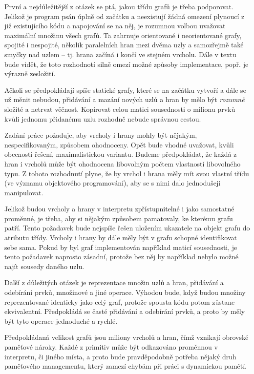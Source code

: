 \documentclass[11pt,twoside,a4paper]{book}
\begin{document}
První a nejdůležitější z otázek se ptá, jakou třídu grafů je třeba podporovat. Jelikož je program psán úplně od začátku a neexistují žádná omezení plynoucí z již existujícího kódu a napojování se na něj, je rozumnou volbou uvažovat maximální množinu všech grafů. Ta zahrnuje orientované i neorientované grafy, spojité i nespojité, několik paralelních hran mezi dvěma uzly a samozřejmě také smyčky nad uzlem -- tj. hrana začíná i končí ve stejném vrcholu. Dále v textu bude vidět, že toto rozhodnotí silně omezí možné způsoby implementace, popř. je výrazně zesložití.

Ačkoli se předpokládají spíše statické grafy, které se na začátku vytvoří a dále se už měnit nebudou, přidávání a mazání nových uzlů a hran by mělo být \textit{rozumně} složité a netrvat věčnost. Kopírovat celou matici sousednosti o milionu prvků kvůli jednomu přidanému uzlu rozhodně nebude správnou cestou.

Zadání práce požaduje, aby vrcholy i hrany mohly být nějakým, nespecifikovaným, způsobem ohodnoceny. Opět bude vhodné uvažovat, kvůli obecnosti řešení, maximalistickou variantu. Budeme předpokládat, že každá z hran i vrcholů může být ohodnocena libovolným počtem vlastností libovolného typu. Z tohoto rozhodnutí plyne, že by vrchol i hrana měly mít svou vlastní třídu (ve významu objektového programování), aby se s nimi dalo jednodušeji manipulovat.

Jelikož budou vrcholy a hrany v interpretu zpřístupnitelné i jako samostatné proměnné, je třeba, aby si nějakým způsobem pamatovaly, ke kterému grafu patří. Tento požadavek bude nejspíše řešen uložením ukazatele na objekt grafu do atributu třídy. Vrcholy i hrany by dále měly být v grafu schopné identifikovat sebe sama. Pokud by byl graf implementován například maticí sousednosti, je tento požadavek naprosto zásadní, protože bez něj by například nebylo možné najít sousedy daného uzlu.

Další z důležitých otázek je reprezentace množin uzlů a hran, přidávání a odebírání prvků, množinové a jiné operace. Výhodou bude, když budou množiny reprezentované identicky jako celý graf, protože spousta kódu potom zůstane ekvivalentní. Předpokládá se časté přidávání a odebírání prvků, a proto by měly být tyto operace jednoduché a rychlé.

Předpokládaná velikost grafů jsou miliony vrcholů a hran, čímž vznikají ob\-rov\-ské pa\-mě\-ťo\-vé nároky. Každé z primitiv může být odkazováno proměnnou v interpretu, či jiného místa, a proto bude pravděpodobně potřeba nějaký druh paměťového managementu, který zamezí chybám při práci s dynamickou pamětí.
\end{document}
